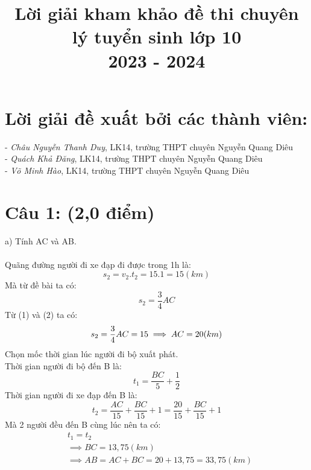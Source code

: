 \documentclass[50pt]{article}
\title{\textbf{\color[HTML]{326fbf}Lời giải kham khảo đề thi chuyên lý tuyển sinh lớp 10\\ 2023 - 2024}}
\begin{document}
\maketitle

\section*{\color[HTML]{4287f5}Lời giải đề xuất bởi các thành viên:}
- \textit{Châu Nguyễn Thanh Duy}, LK14, trường THPT chuyên Nguyễn Quang Diêu\\
- \textit{Quách Khả Đăng}, LK14, trường THPT chuyên Nguyễn Quang Diêu\\
- \textit{Võ Minh Hào}, LK14, trường THPT chuyên Nguyễn Quang Diêu\\
\hline
\section*{\color[HTML]{4287f5}Câu 1: (2,0 điểm)}
a) Tính AC và AB.\\
\\
Quãng đường người đi xe đạp đi được trong 1h là:\\
\begin{equation}
    s_{2} = v_{2}.t_{2} = 15.1 = 15 (km)
\end{equation}
Mà từ đề bài ta có:\\
\begin{equation}
    s_{2} = \dfrac{3}{4}AC
\end{equation}
Từ (1) và (2) ta có:
\begin{equation*}
    s_{2} = \dfrac{3}{4}AC = 15 \\
    \implies AC = 20 (km)
\end{equation*}
Chọn mốc thời gian lúc người đi bộ xuất phát.\\
Thời gian người đi bộ đến B là:
\begin{equation*}
    t_{1} = \dfrac{BC}{5} + \dfrac{1}{2}
\end{equation*}
Thời gian người đi xe đạp đến B là:
\begin{equation*}
    t_{2} = \dfrac{AC}{15} + \dfrac{BC}{15} + 1 = \dfrac{20}{15} + \dfrac{BC}{15} + 1
\end{equation*}
Mà 2 người đều đến B cùng lúc nên ta có: \\
\begin{equation*}
    \begin{aligned}
        & t_{1} = t_{2} \\
        & \implies BC = 13,75 (km) \\
        & \implies AB = AC + BC = 20 + 13,75 = 33,75 (km)
    \end{aligned}
\end{equation*}
\end{document}
